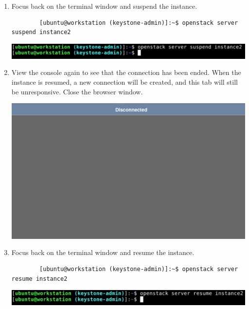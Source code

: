 \documentclass[letterpaper, 12pt]{article}
\begin{document}
\begin{enumerate}
    \item Focus back on the terminal window and suspend the instance.
    \begin{lstlisting}
        [ubuntu@workstation (keystone-admin)]:~$ openstack server suspend instance2
    \end{lstlisting}

    \begin{center}
        \includegraphics[width=\linewidth]{images/part4/step10.png}
    \end{center}

    \item View the console again to see that the connection has been ended. When the instance is resumed, a new
    connection will be created, and this tab will still be unresponsive. Close the browser window.

    \begin{center}
        \includegraphics[width=\linewidth]{images/part4/step11.png}
    \end{center}

    \item Focus back on the terminal window and resume the instance.
    \begin{lstlisting}
        [ubuntu@workstation (keystone-admin)]:~$ openstack server resume instance2
    \end{lstlisting}

    \begin{center}
        \includegraphics[width=\linewidth]{images/part4/step12.png}
    \end{center}


\end{enumerate}
\end{document}
